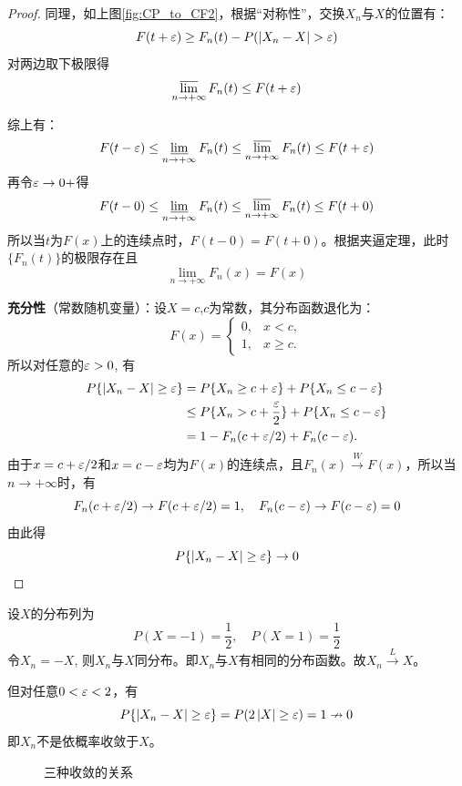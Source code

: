 \begin{proof}
    同理，如上图\ref{fig:CP_to_CF2}，根据“对称性”，交换$X_n$与$X$的位置有：
    \[ F(t+\varepsilon) \ge F_n(t) - P(\left\vert X_n-X \right\vert >\varepsilon)\]
    对两边取下极限得
    \[ \varlimsup_{n \to +\infty} F_n(t) \leq  F(t+\varepsilon) \]

    综上有：
    \[ F(t-\varepsilon) \leq \varliminf_{n \to +\infty} F_n(t) \le \varlimsup_{n \to +\infty} F_n(t) \leq  F(t+\varepsilon) \]
    再令$\varepsilon \to 0+$得
    \[ F(t-0) \leq \varliminf_{n \to +\infty} F_n(t) \le \varlimsup_{n \to +\infty} F_n(t) \leq  F(t+0) \]
    所以当$t$为$F(x)$上的连续点时，$F(t-0)=F(t+0)$。根据夹逼定理，此时$\{ F_n(t) \}$的极限存在且
    \[ \lim_{n \to +\infty} F_n(x) = F(x) \]

    \textbf{充分性}（常数随机变量）：设$X=c$,$c$为常数，其分布函数退化为：
    \[ F(x) = \begin{cases}
            0, & x < c,    \\
            1, & x \geq c.
        \end{cases} \]
    所以对任意的$\varepsilon > 0$, 有
    \begin{align*}
        P\{ \left\vert X_n-X \right\vert \ge \varepsilon \} & = P\{ X_n \geq c + \varepsilon \} + P\{ X_n \le  c - \varepsilon \}           \\
                                                   & \leq P\{ X_n > c + \frac{\varepsilon}{2} \} + P\{ X_n \le  c - \varepsilon \} \\
                                                   & = 1 - F_n( c + \varepsilon / 2 ) + F_n( c - \varepsilon ).
    \end{align*}
    由于$x = c + \varepsilon / 2$和$x = c - \varepsilon$均为$F(x)$的连续点，且$F_n(x) \stackrel{W}{\to} F(x)$，所以当$n \to +\infty$时，有
    \[ F_n( c + \varepsilon / 2 ) \to F( c + \varepsilon / 2 ) = 1, \quad F_n( c - \varepsilon) \to F( c - \varepsilon ) = 0 \]
    由此得
    \[ P\{ \left\vert X_n-X \right\vert \ge \varepsilon \} \to 0 \]
\end{proof}

\begin{example}[依分布收敛而不依概率收敛]
    设$X$的分布列为
    \[ P( X = -1 ) = \frac1{2}, \quad P( X = 1) = \frac1{2} \]
    令$X_n = -X$, 则$X_n$与$X$同分布。即$X_n$与$X$有相同的分布函数。故$X_n \stackrel{L}{\to} X$。

    但对任意$0 < \varepsilon < 2$，有
    \[ P\{ \left\vert X_n-X \right\vert \ge \varepsilon \} = P( 2 \left\vert X \right\vert \geq \varepsilon ) = 1 \nrightarrow 0 \]
    即$X_n$不是依概率收敛于$X$。
\end{example}

\begin{figure}[H]
    \centering
    \caption{三种收敛的关系}
    \label{fig:relationship_among_converges}
\end{figure}

